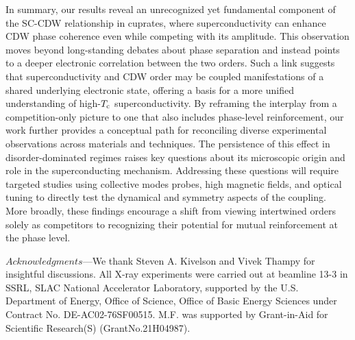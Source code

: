 \documentclass[floatfix,aps,twocolumn,preprintnumbers,superscriptaddress,floatfix,prl]{revtex4-2}
\begin{document}
In summary, our results reveal an unrecognized yet fundamental component of the SC-CDW relationship in cuprates, where superconductivity can enhance CDW phase coherence even while competing with its amplitude. This observation moves beyond long-standing debates about phase separation and instead points to a deeper electronic correlation between the two orders. Such a link suggests that superconductivity and CDW order may be coupled manifestations of a shared underlying electronic state, offering a basis for a more unified understanding of high-$T_{\rm c}$ superconductivity. By reframing the interplay from a competition-only picture to one that also includes phase-level reinforcement, our work further provides a conceptual path for reconciling diverse experimental observations across materials and techniques. The persistence of this effect in disorder-dominated regimes raises key questions about its microscopic origin and role in the superconducting mechanism. Addressing these questions will require targeted studies using collective modes probes, high magnetic fields, and optical tuning to directly test the dynamical and symmetry aspects of the coupling. More broadly, these findings encourage a shift from viewing intertwined orders solely as competitors to recognizing their potential for mutual reinforcement at the phase level.





$Acknowledgments$—We thank Steven A. Kivelson and Vivek Thampy for insightful discussions. All X-ray experiments were carried out at beamline 13-3 in SSRL, SLAC National Accelerator Laboratory, supported by the U.S. Department of Energy, Office of Science, Office of Basic Energy Sciences under Contract No. DE-AC02-76SF00515. M.F. was supported by Grant-in-Aid for Scientific Research(S) (GrantNo.21H04987).
\end{document}
